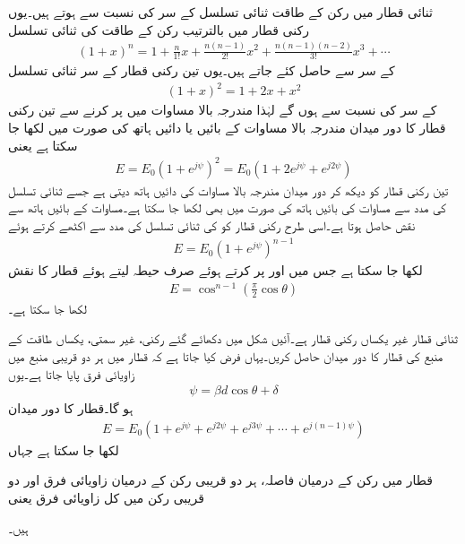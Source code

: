 ثنائی قطار میں رکن کے طاقت ثنائی تسلسل کے سر کی نسبت سے ہوتے ہیں۔یوں  رکنی قطار میں بالترتیب رکن کے طاقت  کی ثنائی تسلسل
\begin{align}
(1+x)^n =1+\frac{n}{1!}x+\frac{n(n-1)}{2!}x^2+\frac{n(n-1)(n-2)}{3!}x^3+\cdots
\end{align}
  کے سر سے حاصل کئے جاتے ہیں۔یوں تین رکنی قطار کے سر ثنائی تسلسل
\begin{align}
(1+x)^2=1+2x+x^2
\end{align} 
کے سر کی نسبت  سے  ہوں گے لہٰذا مندرجہ بالا مساوات میں  پر کرنے سے تین رکنی قطار کا دور میدان مندرجہ بالا مساوات کے بائیں یا دائیں ہاتھ کی صورت میں لکھا جا سکتا ہے یعنی 
\begin{align}
E=E_0\left(1+e^{j\psi} \right)^2 =E_0 (1+2e^{j\psi} +e^{j 2\psi})
\end{align}
تین رکنی قطار کو دیکھ کر دور میدان مندرجہ بالا مساوات کی دائیں ہاتھ دیتی ہے جسے ثنائی تسلسل کی مدد سے مساوات کی بائیں ہاتھ کی صورت میں بھی لکھا جا سکتا ہے۔مساوات کے بائیں ہاتھ سے نقش  حاصل ہوتا ہے۔اسی طرح  رکنی قطار کو  کی ثنائی تسلسل کی مدد سے اکٹھے کرتے ہوئے
\begin{align}
E=E_0 \left(1+e^{j\psi} \right)^{n-1}
\end{align}
لکھا جا سکتا ہے جس میں  اور  پر کرتے ہوئے صرف حیطہ لیتے ہوئے قطار کا نقش
\begin{align}
E=\cos^{n-1} \left(\frac{\pi}{2} \cos \theta\right)
\end{align}
لکھا جا سکتا ہے۔

ثنائی قطار غیر یکساں رکنی قطار ہے۔آئیں شکل میں دکھائے گئے  رکنی، غیر سمتی،  یکساں طاقت کے منبع کی قطار کا دور میدان حاصل کریں۔یہاں فرض کیا جاتا ہے کہ قطار میں ہر دو قریبی منبع میں  زاویائی فرق پایا جاتا ہے۔یوں
\begin{align}
\psi=\beta d \cos \theta +\delta
\end{align}
ہو گا۔قطار  کا دور میدان
\begin{align}\label{مساوات_اینٹینا_یکساں_قطار_الف}
E=E_0\left(1+e^{j \psi}+e^{j 2 \psi}+e^{j 3 \psi} +\cdots +e^{j(n-1)\psi} \right)
\end{align}
لکھا جا سکتا ہے جہاں
\begin{description}
 قطار میں رکن کے درمیان فاصلہ،
 ہر دو قریبی رکن کے درمیان زاویائی فرق اور
 دو قریبی رکن میں کل زاویائی فرق یعنی 
\end{description}
ہیں۔

